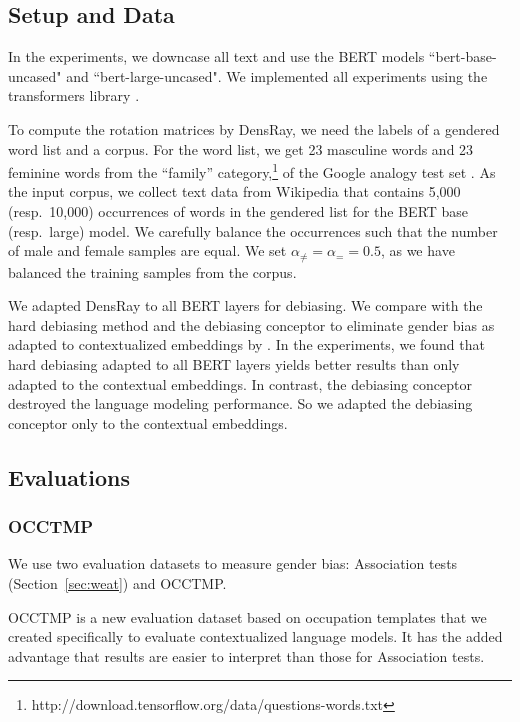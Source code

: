 \subsection{Setup and Data}
In the experiments, we downcase all text and use the BERT models ``bert-base-uncased" and ``bert-large-uncased". We implemented all experiments using the transformers library \cite{wolf2019huggingfaces}.

To compute the rotation matrices by DensRay, we need the
labels of a gendered word list and a corpus. For the word
list, we get 23 masculine words and 23 feminine words from
the ``family''
category,\footnote{http://download.tensorflow.org/data/questions-words.txt}
of the Google analogy test set \cite{mikolov2013efficient}. As the input corpus, we collect text data from Wikipedia that contains 5,000 (resp.\ 10,000)
occurrences of words in the gendered list for the BERT base
(resp.\ large) model. We carefully balance the occurrences such that the number of male and female samples are equal. We set  $\alpha_{\neq}=\alpha_{=}=0.5$, as we have balanced the training samples from the corpus.

We adapted DensRay to all BERT layers for debiasing. We compare with the hard debiasing method \cite{mu2018all} and the debiasing conceptor \cite{karve2019conceptor} to eliminate gender bias as adapted to contextualized embeddings by \cite{karve2019conceptor}. In the experiments, we found that hard debiasing adapted to all BERT layers yields better results than only adapted to the contextual embeddings. In contrast, the debiasing conceptor destroyed the language modeling performance. So we adapted the debiasing conceptor only to the contextual embeddings. 

\subsection{Evaluations}
\subsubsection{OCCTMP}
We use two evaluation datasets to measure gender bias: Association tests (Section~\ref{sec:weat}) and OCCTMP.

OCCTMP is a new evaluation dataset based on occupation templates
that we created specifically to evaluate contextualized language models.  It has the added advantage that results are easier to interpret than those for Association tests.

